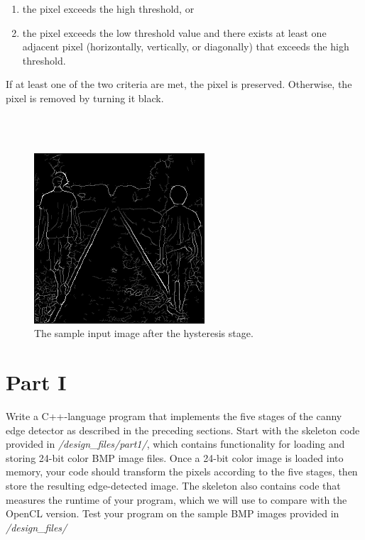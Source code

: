 \documentclass[epsfig,10pt,fullpage]{article}
\begin{document}
\begin{enumerate}
\item the pixel exceeds the high threshold, or
\item the pixel exceeds the low threshold value and there exists at least one adjacent pixel (horizontally, vertically, or diagonally) that exceeds the high threshold.
\end{enumerate}

If at least one of the two criteria are met, the pixel is preserved. Otherwise, the pixel is removed by turning it black.
 
~\\
~\\
\begin{figure}[H]
   \begin{center}
       \includegraphics[scale = 0.85]{figures/fig_stage5_hysteresis.png}
   \end{center}
   \caption{The sample input image after the hysteresis stage.}
	\label{fig:sample_stage5}
\end{figure}

\newpage
\section*{Part I}

Write a C++-language program that implements the five stages of the canny edge detector as described in the preceding sections. Start with the skeleton code provided in \textit{/design\_files/part1/}, which contains functionality for loading and storing 24-bit color BMP image files. Once a 24-bit color image is loaded into memory, your code should transform the pixels according to the five stages, then store the resulting edge-detected image. The skeleton also contains code that measures the runtime of your program, which we will use to compare with the OpenCL version. Test your program on the sample BMP 
images provided in \textit{/design\_files/}
\end{document}
